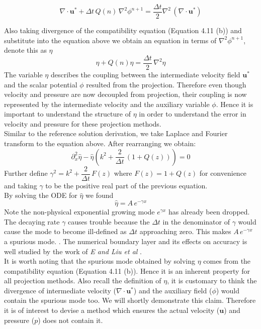 \begin{equation}
\nabla \cdot \textbf{u}^* + \Delta t \,Q(n)\,\nabla^2 \phi^{n+1} = \dfrac{\Delta t}{2} \nabla^2 \,(\nabla \cdot \textbf{u}^*)
\end{equation}

Also taking divergence of the compatibility equation (Equation 4.11 (b)) and substitute into the equation above we obtain an equation in terms of $\nabla^2\phi^{n+1}$, denote this as $\eta$
\begin{equation*}
\eta + Q(n)\eta = \dfrac{\Delta t}{2}\, \nabla^2 \eta
\end{equation*}
The variable $\eta$ describes the coupling between the intermediate velocity field $\textbf{u}^*$ and the scalar potential $\phi$ resulted from the projection. Therefore even though velocity and pressure are now decoupled from projection, their coupling is now represented by the intermediate velocity and the auxiliary variable $\phi$. Hence it is important to understand the structure of $\eta$ in order to understand the error in velocity and pressure for these projection methods.\\

Similar to the reference solution derivation, we take Laplace and Fourier transform to the equation above. After rearranging we obtain:
\begin{equation}
\partial_x^2 \hat{\eta} - \hat{\eta} (k^2 + \dfrac{2}{\Delta t}\,(1+Q(z))) = 0
\end{equation}
Further define $\gamma^2 = k^2 + \dfrac{2}{\Delta t}\,F(z)$ where $F(z) = 1 + Q(z)$ for convenience and taking $\gamma$ to be the positive real part of the previous equation.\\

By solving the ODE for $\hat{\eta}$ we found
\begin{equation}
\hat{\eta} = A\,e^{-\gamma x}
\end{equation}
Note the non-physical exponential growing mode $e^{\gamma x}$ has already been dropped.\\

The decaying rate $\gamma$ causes trouble because the $\Delta t$ in the denominator of $\gamma$ would cause the mode to become ill-defined as $\Delta t$ approaching zero. This makes $A\,e^{-\gamma x}$ a spurious mode. \cite{brown2001accurate, strikwerda1999accuracy}. The numerical boundary layer and its effects on accuracy is well studied by the work of \emph{E and Liu et al} \cite{liu1996projection}. \\
It is worth noting that the spurious mode obtained by solving $\eta$ comes from the compatibility equation (Equation 4.11 (b)). Hence it is an inherent property for all projection methods. Also recall the definition of $\eta$, it is customary to think the divergence of intermediate velocity ($\nabla \cdot \textbf{u}^*$) and the auxiliary field ($\phi$) would contain the spurious mode too. We will shortly demonstrate this claim. Therefore it is of interest to devise a method which ensures the actual velocity ($\textbf{u}$) and pressure ($p$) does not contain it. \\

